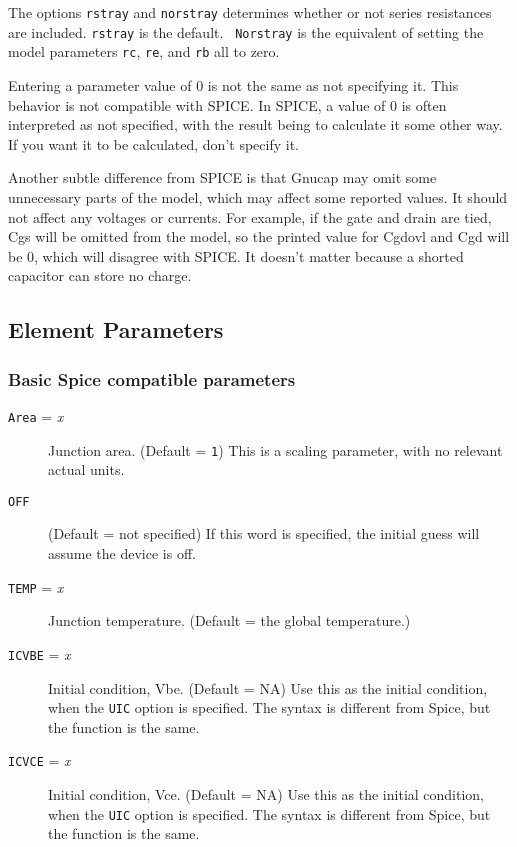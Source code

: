 The options {\tt rstray} and {\tt norstray} determines whether or not
series resistances are included. {\tt rstray} is the default.  {\tt
Norstray} is the equivalent of setting the model parameters {\tt rc},
{\tt re}, and {\tt rb} all to zero.

Entering a parameter value of 0 is not the same as not specifying
it.  This behavior is not compatible with SPICE.  In SPICE, a value
of 0 is often interpreted as not specified, with the result being
to calculate it some other way.  If you want it to be calculated,
don't specify it.

Another subtle difference from SPICE is that Gnucap may omit some
unnecessary parts of the model, which may affect some reported
values.  It should not affect any voltages or currents.  For example,
if the gate and drain are tied, Cgs will be omitted from the model,
so the printed value for Cgdovl and Cgd will be 0, which will
disagree with SPICE.  It doesn't matter because a shorted capacitor
can store no charge.
\subsection{Element Parameters}

\subsubsection{Basic Spice compatible parameters}

\begin{description}

\item[{\tt Area} = {\it x}]
Junction area.  (Default = {\tt 1}) This is a scaling parameter, with
no relevant actual units.

\item[{\tt OFF}] 
(Default = not specified) If this word is specified, the initial guess
will assume the device is off.

\item[{\tt TEMP} = {\it x}]
Junction temperature. (Default = the global temperature.)

\item[{\tt ICVBE} = {\it x}]
Initial condition, Vbe.  (Default = NA) Use this as the initial
condition, when the {\tt UIC} option is specified.  The syntax is
different from Spice, but the function is the same.

\item[{\tt ICVCE} = {\it x}]
Initial condition, Vce.  (Default = NA) Use this as the initial
condition, when the {\tt UIC} option is specified.  The syntax is
different from Spice, but the function is the same.

\end{description}
